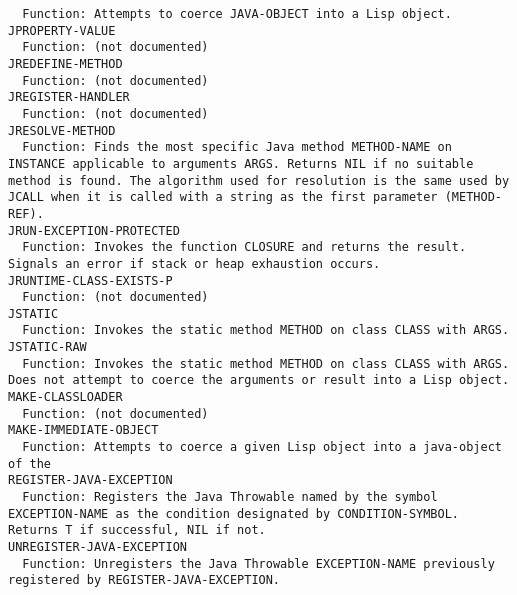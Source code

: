 \begin{verbatim}
  Function: Attempts to coerce JAVA-OBJECT into a Lisp object.
JPROPERTY-VALUE
  Function: (not documented)
JREDEFINE-METHOD
  Function: (not documented)
JREGISTER-HANDLER
  Function: (not documented)
JRESOLVE-METHOD
  Function: Finds the most specific Java method METHOD-NAME on INSTANCE applicable to arguments ARGS. Returns NIL if no suitable method is found. The algorithm used for resolution is the same used by JCALL when it is called with a string as the first parameter (METHOD-REF).
JRUN-EXCEPTION-PROTECTED
  Function: Invokes the function CLOSURE and returns the result.  Signals an error if stack or heap exhaustion occurs.
JRUNTIME-CLASS-EXISTS-P
  Function: (not documented)
JSTATIC
  Function: Invokes the static method METHOD on class CLASS with ARGS.
JSTATIC-RAW
  Function: Invokes the static method METHOD on class CLASS with ARGS. Does not attempt to coerce the arguments or result into a Lisp object.
MAKE-CLASSLOADER
  Function: (not documented)
MAKE-IMMEDIATE-OBJECT
  Function: Attempts to coerce a given Lisp object into a java-object of the
REGISTER-JAVA-EXCEPTION
  Function: Registers the Java Throwable named by the symbol EXCEPTION-NAME as the condition designated by CONDITION-SYMBOL.  Returns T if successful, NIL if not.
UNREGISTER-JAVA-EXCEPTION
  Function: Unregisters the Java Throwable EXCEPTION-NAME previously registered by REGISTER-JAVA-EXCEPTION.

\end{verbatim}
